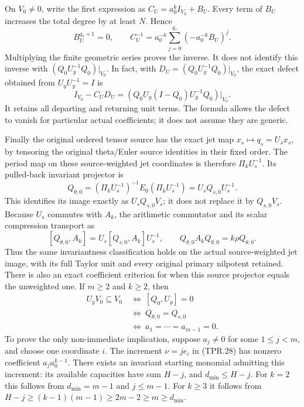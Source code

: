 On \(V_0\ne0\), write the first expression as
\(C_U=a_0^k I_{V_0}+B_U\).
Every term of \(B_U\) increases the total degree by at
least \(N\). Hence
\[
 B_U^{q_*+1}=0,\qquad
 C_U^{-1}
   =a_0^{-k}\sum_{j=0}^{q_*}(-a_0^{-k}B_U)^j .
 \tag{TPR.31}
\]
Multiplying the finite geometric series proves the inverse.
It does not identify this inverse with
\((Q_0U_y^{-1}Q_0)|_{V_0}\).
In fact, with \(D_U=(Q_0U_y^{-1}Q_0)|_{V_0}\),
the exact defect obtained from \(U_yU_y^{-1}=I\) is
\[
 I_{V_0}-C_UD_U
      =(Q_0U_y(I-Q_0)U_y^{-1}Q_0)|_{V_0}.
 \tag{TPR.32}
\]
It retains all departing and returning unit terms.
The formula allows the defect to vanish for particular
actual coefficients; it does not assume they are generic.

Finally the original ordered tensor source has the exact jet
map \(x_s\mapsto q_s=U_sx_s\), by tensoring the original
theta/Euler source identities in their fixed order.
The period map on these source-weighted jet coordinates
is therefore \(\Pi_kU_s^{-1}\). Its pulled-back invariant
projector is
\[
 Q_{\theta,0}
   =(\Pi_kU_s^{-1})^{-1}E_0(\Pi_kU_s^{-1})
   =U_sQ_{s,0}U_s^{-1}.
 \tag{TPR.33}
\]
This identifies its image exactly as \(U_sQ_{s,0}V_s\);
it does not replace it by \(Q_{s,0}V_s\).
Because \(U_s\) commutes with \(A_k\), the arithmetic
commutator and its scalar compression transport as
\[
 [Q_{\theta,0},A_k]
     =U_s[Q_{s,0},A_k]U_s^{-1},\qquad
 Q_{\theta,0}A_kQ_{\theta,0}=k\rho Q_{\theta,0}.
 \tag{TPR.34}
\]
Thus the same invariantness classification holds on the
actual source-weighted jet image, with its full Taylor
unit and every original primary nilpotent retained.
There is also an exact coefficient criterion for when this
source projector equals the unweighted one. If \(m\geq2\)
and \(k\geq2\), then
\[
 \begin{split}
 U_yV_0\subseteq V_0
 &\ \Longleftrightarrow\ [Q_0,U_y]=0\\
 &\ \Longleftrightarrow\ Q_{\theta,0}=Q_{s,0}\\
 &\ \Longleftrightarrow\ a_1=\cdots=a_{m-1}=0 .
 \end{split}
 \tag{TPR.35}
\]
To prove the only non-immediate implication, suppose
\(a_j\ne0\) for some \(1\leq j<m\), and choose one
coordinate \(i\). The increment \(\nu=je_i\) in (TPR.28)
has nonzero coefficient \(a_ja_0^{k-1}\).
There exists an invariant starting monomial admitting this
increment: its available capacities have sum \(H-j\),
and \(d_{\min}\leq H-j\). For \(k=2\) this follows from
\(d_{\min}=m-1\) and \(j\leq m-1\).
For \(k\geq3\) it follows from
\(H-j\geq(k-1)(m-1)\geq2m-2\geq m\geq d_{\min}\).
